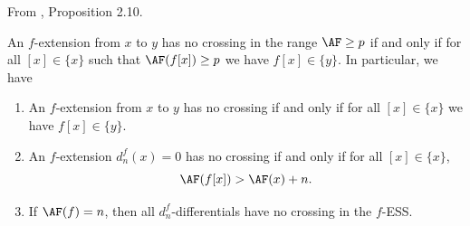 \begin{proposition}
\label{paper:2.10}
From \cite{LWX126}, Proposition 2.10.\par
\label{prop:i8r47oe}
    An $f$-extension from $x$ to $y$ has no crossing in the range $\AF\ge p$ if and only if for all $[x]\in \{x\}$ such that $\AF(f[x])\ge p$ we have $f[x]\in \{y\}$. In particular, we have
    \begin{enumerate}
        \item An $f$-extension from $x$ to $y$ has no crossing if and only if for all $[x]\in \{x\}$ we have $f[x]\in \{y\}$.
        \item An $f$-extension $d_n^{f}(x)=0$ has no crossing if and only if for all $[x]\in \{x\}$,
        $$\AF(f[x]) >\AF(x)+n.$$
        \item If $\AF(f)=n$, then all $d^f_n$-differentials have no crossing in the $f$-ESS.
    \end{enumerate}




\end{proposition}
